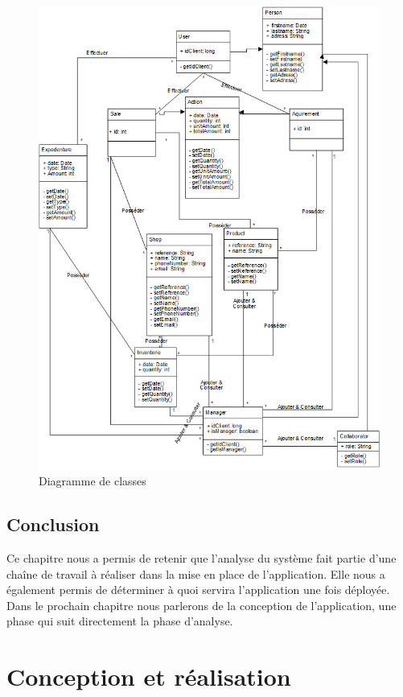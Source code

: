 \documentclass[12pt]{report}
\begin{document}
      \begin{figure}[H]
		\begin{center}
		  \includegraphics[scale=0.7]{images/diagramClass.png}
		  \caption{Diagramme de classes}
		\end{center}
	  \end{figure}
      
      \section{Conclusion}
      Ce chapitre nous a permis de retenir que l'analyse du système fait partie d'une chaîne de travail à réaliser dans la mise en place de l'application. Elle nous a également permis de déterminer à quoi servira l'application une fois déployée. Dans le prochain chapitre nous parlerons de la conception de l'application, une phase qui suit directement la phase d'analyse.
      
    \chapter{Conception et réalisation}
\end{document}
